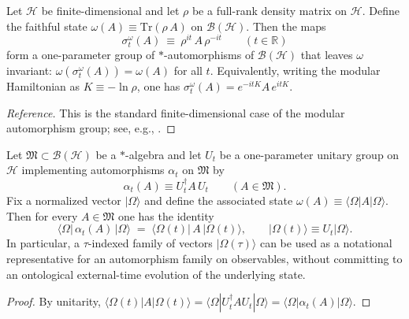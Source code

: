 \begin{theorem}
\label{thm:modular_finite}
Let $\mathcal{H}$ be finite-dimensional and let $\rho$ be a full-rank density matrix on $\mathcal{H}$. Define the faithful state $\omega(A)\equiv \mathrm{Tr}(\rho\,A)$ on $\mathcal{B}(\mathcal{H})$. Then the maps
\begin{equation}
    \sigma_t^\omega(A)\ \equiv\ \rho^{it}\,A\,\rho^{-it}\qquad (t\in\mathbb{R})
\end{equation}
form a one-parameter group of $*$-automorphisms of $\mathcal{B}(\mathcal{H})$ that leaves $\omega$ invariant: $\omega(\sigma_t^\omega(A))=\omega(A)$ for all $t$.
Equivalently, writing the modular Hamiltonian as $K\equiv -\ln\rho$, one has $\sigma_t^\omega(A)=e^{-itK}A\,e^{itK}$.
\end{theorem}
\begin{proof}[Reference]
This is the standard finite-dimensional case of the modular automorphism group; see, e.g., \cite{Takesaki2002}.
\end{proof}

\begin{proposition}
\label{prop:pictures_automorphisms}
Let $\mathfrak{M}\subset\mathcal{B}(\mathcal{H})$ be a $*$-algebra and let $U_t$ be a one-parameter unitary group on $\mathcal{H}$ implementing automorphisms $\alpha_t$ on $\mathfrak{M}$ by
\begin{equation}
    \alpha_t(A)\equiv U_t^\dagger A\,U_t\qquad (A\in\mathfrak{M}).
\end{equation}
Fix a normalized vector $|\Omega\rangle$ and define the associated state $\omega(A)\equiv\langle\Omega|A|\Omega\rangle$.
Then for every $A\in\mathfrak{M}$ one has the identity
\begin{equation}
    \langle \Omega|\,\alpha_t(A)\,|\Omega\rangle
    \;=\;
    \langle \Omega(t)|\,A\,|\Omega(t)\rangle,
    \qquad |\Omega(t)\rangle\equiv U_t|\Omega\rangle.
\end{equation}
In particular, a $\tau$-indexed family of vectors $|\Omega(\tau)\rangle$ can be used as a notational representative for an automorphism family on observables, without committing to an ontological external-time evolution of the underlying state.
\end{proposition}
\begin{proof}
By unitarity, $\langle\Omega(t)|A|\Omega(t)\rangle=\langle\Omega|U_t^\dagger A U_t|\Omega\rangle=\langle\Omega|\alpha_t(A)|\Omega\rangle$.
\end{proof}

